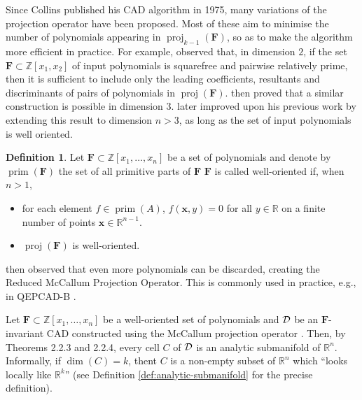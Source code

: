 \documentclass[
]{book}
\theoremstyle{definition}
\newtheorem{definition}{Definition}[chapter]
\theoremstyle{definition}
\theoremstyle{definition}
\theoremstyle{definition}
\theoremstyle{remark}
\begin{document}
Since Collins published his CAD algorithm in 1975, many variations of the projection operator have been proposed. Most of these aim to minimise the number of polynomials appearing in \(\operatorname{proj}_{k-1}(\mathbf{F})\), so as to make the algorithm more efficient in practice.
For example, \citet{collins1975} observed that, in dimension \(2\), if the set \(\mathbf{F} \subset \mathbb{Z}[x_1,x_2]\) of input polynomials is
squarefree and pairwise relatively prime, then it is sufficient to include only the leading
coefficients, resultants and discriminants of pairs of polynomials in \(\operatorname{proj}(\mathbf{F})\). \citet{mccallum1988} then proved that a
similar construction is possible in dimension \(3\).
\citet{mccallum1998} later improved upon his previous work by extending this result to dimension \(n > 3\), as long as the set of input polynomials is well oriented.

\begin{definition}

\citep[6.1]{mccallum1998}
Let \(\mathbf{F} \subset \mathbb{Z}[x_1, \ldots, x_n]\) be a set of polynomials and denote by \(\operatorname{prim}(\mathbf{F})\) the set of all primitive parts of \(\mathbf{F}\)
\(\mathbf{F}\) is called well-oriented if, when \(n > 1\),

\begin{itemize}
\item
  for each element \(f \in \operatorname{prim}(A)\), \(f(\mathbf{x},y) = 0\) for all \(y\in \mathbb{R}\) on a finite number of points \(\mathbf{x} \in \mathbb{R}^{n-1}\). \citep[condition WO1]{mccallum1998}
\item
  \(\operatorname{proj}(\mathbf{F})\) is well-oriented. \citep[condition WO2]{mccallum1998}
\end{itemize}

\end{definition}

\citet{brown2001} then observed that even more polynomials can be discarded, creating the Reduced McCallum Projection Operator. This is commonly used in practice, e.g., in QEPCAD-B \citep{brownQepcad}.

Let \(\mathbf{F} \subset \mathbb{Z}[x_1,\ldots,x_n]\) be a well-oriented set of polynomials and \(\cal D\) be an \(\mathbf{F}\)-invariant CAD constructed using the McCallum projection operator \citep{mccallum1998}. Then, by \citet{mccallum1988} Theorems 2.2.3 and 2.2.4, every cell \(C\) of \(\cal D\) is an analytic submanifold of \(\mathbb{R}^n\). Informally, if \(\dim(C) = k\), thent \(C\) is a non-empty subset of \(\mathbb{R}^n\) which ``looks locally like \(\mathbb{R}^k\)'' (see Definition \ref{def:analytic-submanifold} for the precise definition).
\end{document}
